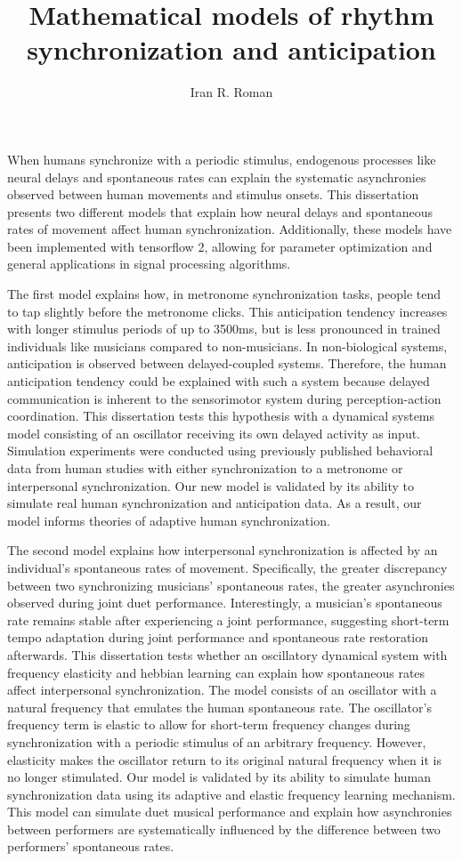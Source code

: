 \documentclass{report}
\begin{document}
\title{Mathematical models of rhythm synchronization and anticipation}
\author{Iran R. Roman}

\beforepreface

When humans synchronize with a periodic stimulus, endogenous processes like neural delays and spontaneous rates can explain the systematic asynchronies observed between human movements and stimulus onsets. This dissertation presents two different models that explain how neural delays and spontaneous rates of movement affect human synchronization. Additionally, these models have been implemented with tensorflow 2, allowing for parameter optimization and general applications in signal processing algorithms.

The first model explains how, in metronome synchronization tasks, people tend to tap slightly before the metronome clicks. This anticipation tendency increases with longer stimulus periods of up to 3500ms, but is less pronounced in trained individuals like musicians compared to non-musicians. In non-biological systems, anticipation is observed between delayed-coupled systems. Therefore, the human anticipation tendency could be explained with such a system because delayed communication is inherent to the sensorimotor system during perception-action coordination. This dissertation tests this hypothesis with a dynamical systems model consisting of an oscillator receiving its own delayed activity as input. Simulation experiments were conducted using previously published behavioral data from human studies with either synchronization to a metronome or interpersonal synchronization. Our new model is validated by its ability to simulate real human synchronization and anticipation data. As a result, our model informs theories of adaptive human synchronization.

The second model explains how interpersonal synchronization is affected by an individual's spontaneous rates of movement. Specifically, the greater discrepancy between two synchronizing musicians' spontaneous rates, the greater asynchronies observed during joint duet performance. Interestingly, a musician's spontaneous rate remains stable after experiencing a joint performance, suggesting short-term tempo adaptation during joint performance and spontaneous rate restoration afterwards. This dissertation tests whether an oscillatory dynamical system with frequency elasticity and hebbian learning can explain how spontaneous rates affect interpersonal synchronization. The model consists of an oscillator with a natural frequency that emulates the human spontaneous rate. The oscillator's frequency term is elastic to allow for short-term frequency changes during synchronization with a periodic stimulus of an arbitrary frequency. However, elasticity makes the oscillator return to its original natural frequency when it is no longer stimulated. Our model is validated by its ability to simulate human synchronization data using its adaptive and elastic frequency learning mechanism. This model can simulate duet musical performance and explain how asynchronies between performers are systematically influenced by the difference between two performers' spontaneous rates.
\end{document}
